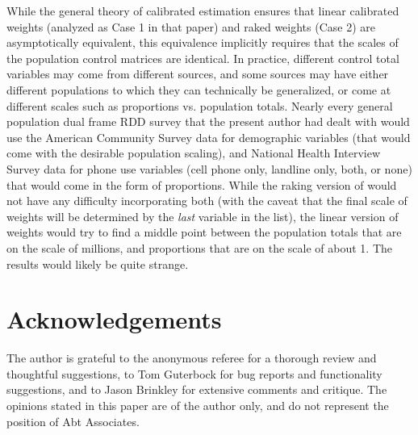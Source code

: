 
While the general theory of calibrated estimation \citep{deville:sarndal:1992}
ensures that linear calibrated weights (analyzed as Case 1 in that paper) and 
raked weights (Case 2) are asymptotically equivalent, this equivalence implicitly
requires that the scales of the population control matrices are identical.
In practice, different control total variables may come from different sources,
and some sources may have either different populations to which they can technically
be generalized, or come at different scales such as proportions vs. population totals.
Nearly every general population dual frame RDD survey that the present author had dealt
with would use the American Community Survey data for demographic variables
(that would come with the desirable population scaling), and National Health Interview Survey
data for phone use variables (cell phone only, landline only, both, or none) that would
come in the form of proportions. While the raking version of  would not
have any difficulty incorporating both (with the caveat that the final scale of weights
will be determined by the \textit{last} variable in the  list),
the linear version of weights would try to find a middle point between the population
totals that are on the scale of millions, and proportions that are on the scale of about 1.
The results would likely be quite strange.















\section*{Acknowledgements}

The author is grateful 
to the anonymous referee for a thorough review and thoughtful suggestions,
to Tom Guterbock for bug reports and functionality suggestions, 
and to Jason Brinkley for extensive comments and critique.
The opinions stated in this paper
are of the author only, and do not represent the position of Abt Associates.



% 


